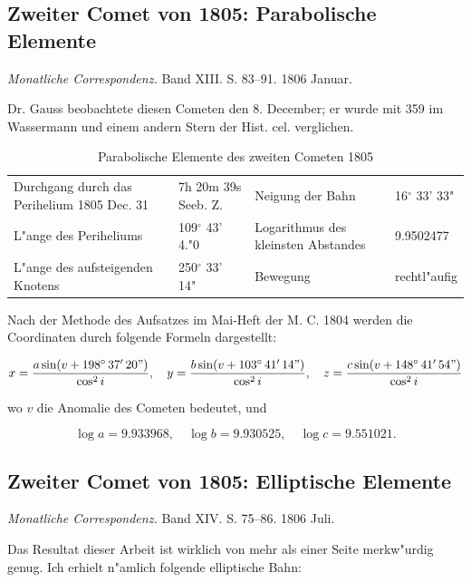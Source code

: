 \documentclass[12pt,a4paper]{article}
\begin{document}
\subsection{Zweiter Comet von 1805: Parabolische Elemente}

\textit{Monatliche Correspondenz.} Band XIII. S. 83--91. 1806 Januar.

Dr. Gauss beobachtete diesen Cometen den 8. December; er wurde mit 359 im Wassermann und einem andern Stern der Hist. cel. verglichen.

\begin{table}[H]
\centering
\begin{tabular}{l l | l l}
\toprule
Durchgang durch das Perihelium 1805 Dec. 31 & 7h 20m 39s Seeb. Z. & Neigung der Bahn & 16$^\circ$ 33' 33" \\
L"ange des Periheliums & 109$^\circ$ 43' 4."0 & Logarithmus des kleinsten Abstandes & 9.9502477 \\
L"ange des aufsteigenden Knotens & 250$^\circ$ 33' 14" & Bewegung & rechtl"aufig \\
\bottomrule
\end{tabular}
\caption{Parabolische Elemente des zweiten Cometen 1805}
\end{table}

Nach der Methode des Aufsatzes im Mai-Heft der M. C. 1804 werden die Coordinaten durch folgende Formeln dargestellt:

\[
x = \frac{a \sin(v + 198^\circ\, 37'\, 20")}{\cos^2 i}, \quad
y = \frac{b \sin(v + 103^\circ\, 41'\, 14")}{\cos^2 i}, \quad
z = \frac{c \sin(v + 148^\circ\, 41'\, 54")}{\cos^2 i}
\]

wo $v$ die Anomalie des Cometen bedeutet, und

\[
\log a = 9.933968, \quad \log b = 9.930525, \quad \log c = 9.551021.
\]

\subsection{Zweiter Comet von 1805: Elliptische Elemente}

\textit{Monatliche Correspondenz.} Band XIV. S. 75--86. 1806 Juli.

Das Resultat dieser Arbeit ist wirklich von mehr als einer Seite merkw"urdig genug. Ich erhielt n"amlich folgende elliptische Bahn:
\end{document}
